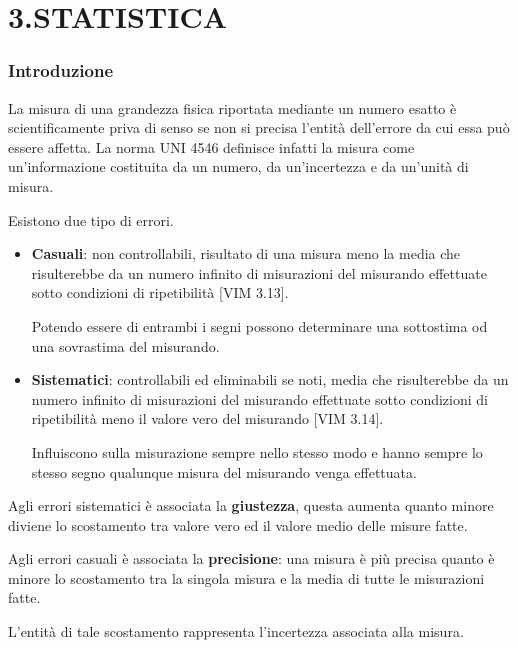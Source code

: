 \documentclass[a4paper, 15pt]{article}
\begin{document}
				\tableofcontents 
				\newpage
				
\part{3.STATISTICA}
\section{Introduzione}	
\begin{adjustwidth}{2in}{}
	 	La misura di una grandezza fisica riportata mediante un numero esatto è scientificamente priva di senso se non si precisa l’entità dell’errore da cui essa può essere affetta. La norma UNI 4546 definisce infatti la misura come un’informazione costituita da un numero, da un’incertezza e da un'unità di misura.
	 	
	 	Esistono due tipo di errori.
	 	\begin{itemize}
	 		\item \textbf{Casuali}: non controllabili, risultato di una misura meno la media che risulterebbe da un numero infinito di misurazioni del misurando effettuate sotto condizioni di ripetibilità [VIM 3.13].
	 		
	 		Potendo essere di entrambi i segni possono determinare una sottostima od una sovrastima del misurando.
	 		
	 		\item \textbf{Sistematici}: controllabili ed eliminabili se noti, media che risulterebbe da un numero infinito di misurazioni del misurando effettuate sotto condizioni di ripetibilità meno il valore vero del misurando [VIM 3.14].
	 		
	 		Influiscono sulla misurazione sempre nello stesso modo e hanno sempre lo stesso segno qualunque misura del misurando venga effettuata.
	 	\end{itemize}
	 	Agli errori sistematici è associata la \textbf{giustezza}, questa aumenta quanto minore diviene lo scostamento tra valore vero ed il valore medio delle misure fatte.\newline
	 	
	 	 Agli errori casuali è associata la \textbf{precisione}: una misura è più precisa quanto è minore lo scostamento tra la singola misura e la media di tutte le misurazioni fatte. 
	 	 
	 	 L’entità di tale scostamento rappresenta l’incertezza associata alla misura.\newline
	 	 

\end{adjustwidth}
\end{document}

